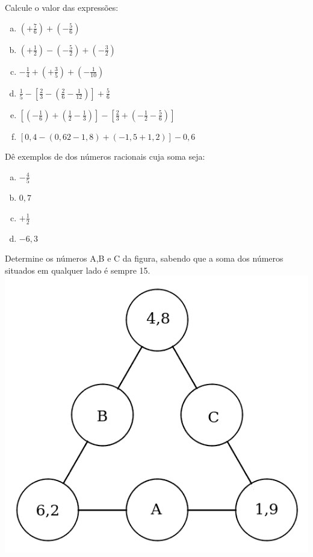 \item Calcule o valor das expressões:
\begin{enumerate}[a)]
	\item $\displaystyle\left(+\frac{7}{6}\right)+\left(-\frac{5}{6}\right)$
	\item $\displaystyle\left(+\frac{1}{2}\right)-\left(-\frac{5}{2}\right)+\left(-\frac{3}{2}\right)$
	\item $-\displaystyle\frac{1}{4}+\left(+\frac{3}{5}\right)+\left(-\frac{1}{10}\right)$
	\item $\displaystyle\frac{1}{5}-\left[\frac{2}{3}-\left(\frac{2}{6}-\frac{1}{12}\right)\right]+\frac{5}{6}$
	\item $\left[\left(-\displaystyle\frac{1}{6}\right)+\left(\displaystyle\frac{1}{2}-\frac{1}{3}\right)\right]-\left[\displaystyle\frac{2}{3}+\left(-\frac{1}{2}-\frac{5}{6}\right)\right]$
	\item $[0,4-(0,62-1,8)+(-1,5+1,2)]-0,6$
\end{enumerate}

\item Dê exemplos de dos números racionais cuja soma seja:
\begin{multicols}{4}
\begin{enumerate}[a)]
	\item $-\displaystyle\frac{4}{5}$
	\item $0,7$
	\item $+\displaystyle\frac{1}{2}$
	\item $-6,3$
\end{enumerate}
\end{multicols}

\begin{multicols}{2} 
\item  Determine os números A,B e C da figura, sabendo que a soma dos números situados em qualquer lado é sempre 15.
\includegraphics[scale=0.3]{figuras/fig100.png}
\end{multicols}


